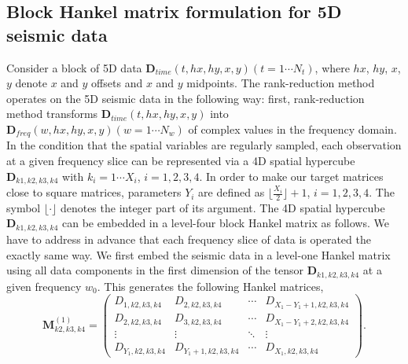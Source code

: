 \subsection{Block Hankel matrix formulation for 5D seismic data}
Consider a block of 5D data $\mathbf{D}_{time}(t,hx,hy,x,y)(t=1\cdots N_t)$, where $hx$, $hy$, $x$, $y$ denote $x$ and $y$ offsets and $x$ and $y$ midpoints. The rank-reduction method operates on the 5D seismic data in the following way: first, rank-reduction method transforms $\mathbf{D}_{time}(t,hx,hy,x,y)$ into $\mathbf{D}_{freq}(w,hx,hy,x,y)(w=1\cdots N_w)$ of complex values in the frequency domain. In the condition that the spatial variables are regularly sampled, each observation at a given frequency slice can be represented via a 4D spatial hypercube $\mathbf{D}_{k1,k2,k3,k4}$ with $k_i=1\cdots X_i$, $i=1,2,3,4$. In order to make our target matrices close to square matrices, parameters $Y_i$ are defined as $\lfloor \frac{X_i}{2} \rfloor +1$, $i=1,2,3,4$.  The symbol $\lfloor\cdot\rfloor$ denotes the integer part of its argument. %
The 4D spatial hypercube $\mathbf{D}_{k1,k2,k3,k4}$ can be embedded in a level-four block Hankel matrix as follows. We have to address in advance that each frequency slice of data is operated the exactly same way. We first embed the seismic data in a level-one Hankel matrix using all data components in the first dimension of the tensor $\mathbf{D}_{k1,k2,k3,k4}$ at a given frequency $w_0$. This generates the following Hankel matrices,
\begin{equation}
\label{eq:levelone}
\mathbf{M}_{k2,k3,k4}^{(1)}=\left(\begin{array}{cccc}
D_{1,k2,k3,k4} & D_{2,k2,k3,k4} & \cdots &D_{X_1-Y_1+1,k2,k3,k4} \\
D_{2,k2,k3,k4} & D_{3,k2,k3,k4}  &\cdots &D_{X_1-Y_1+2,k2,k3,k4} \\
\vdots & \vdots &\ddots &\vdots \\
D_{Y_1,k2,k3,k4}&D_{Y_1+1,k2,k3,k4} &\cdots&D_{X_1,k2,k3,k4}
\end{array}
\right).
\end{equation}

